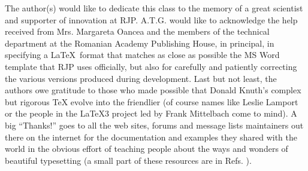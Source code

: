 \documentclass[myclassdoc,debug]{rjparticle}
\begin{document}
\begin{acknowledgement}
The author(s) would like to dedicate this class to the memory of \linebreak
{} a great scientist and supporter of innovation at RJP. A.T.G. would like to acknowledge the help received from Mrs. Margareta Oancea and the members of the technical department at the Romanian Academy Publishing House, in principal, in specifying a \LaTeX\ format that matches as close as possible the MS Word template that RJP uses officially, but also for carefully and patiently correcting the various versions produced during development. Last but not least, the authors owe gratitude to those who made possible that Donald Knuth's \cite{dknuthhp} complex but rigorous \TeX \cite{knuth,teximpacient} evolve into the friendlier \LaTeXe (of course names like Leslie Lamport \cite{leslie} or the people in the \LaTeX3 project led by Frank Mittelbach \cite{mittelbach,ltexclass,ltexshort,ltexclass2} come to mind). A big ``Thanks!'' goes to all the web sites, forums and message lists maintainers out there on the internet for the 
documentation and examples they shared with the world in the obvious effort of teaching people about the ways and wonders of beautiful typesetting (a small part of these resources are in Refs. \cite{texrefex,eijkhout,texcookbook,pagelayout,tug,stacko,web1,web2,web3,web4,web5,web6,web7,web8}).
\end{acknowledgement}
\end{document}
